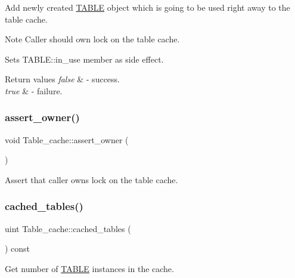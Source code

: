 Add newly created \mbox{\hyperlink{structTABLE}{T\+A\+B\+LE}} object which is going to be used right away to the table cache.

\begin{DoxyNote}{Note}
Caller should own lock on the table cache.

Sets T\+A\+B\+L\+E\+::in\+\_\+use member as side effect.
\end{DoxyNote}

\begin{DoxyRetVals}{Return values}
{\em false} & -\/ success. \\
\hline
{\em true} & -\/ failure. \\
\hline
\end{DoxyRetVals}
\mbox{\label{classTable__cache_a60266ef71fbd59bdcc415880898fb1b4}} 
\subsubsection{\texorpdfstring{assert\+\_\+owner()}{assert\_owner()}}
{\footnotesize\ttfamily void Table\+\_\+cache\+::assert\+\_\+owner (\begin{DoxyParamCaption}{ }\end{DoxyParamCaption})\hspace{0.3cm}{\ttfamily [inline]}}

Assert that caller owns lock on the table cache. \mbox{\label{classTable__cache_ac2d4ee1ea253452eb204577ce0111d0a}} 
\subsubsection{\texorpdfstring{cached\+\_\+tables()}{cached\_tables()}}
{\footnotesize\ttfamily uint Table\+\_\+cache\+::cached\+\_\+tables (\begin{DoxyParamCaption}{ }\end{DoxyParamCaption}) const\hspace{0.3cm}{\ttfamily [inline]}}

Get number of \mbox{\hyperlink{structTABLE}{T\+A\+B\+LE}} instances in the cache. \mbox{\label{classTable__cache_a455cced61e30205fde43e97a40f7889b}} 
